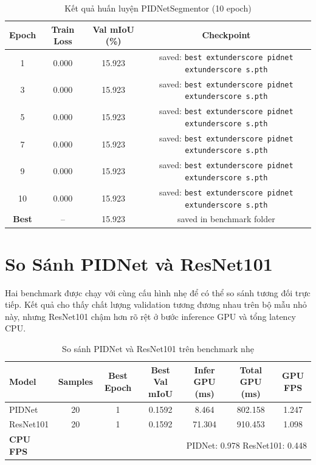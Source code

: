 \documentclass[12pt,a4paper]{article}
\begin{document}
\begin{table}[H]
\centering
\caption{Kết quả huấn luyện PIDNetSegmentor (10 epoch)}
\label{tab:train_res}
\begin{tabular}{cccc}
\toprule
\textbf{Epoch} & \textbf{Train Loss} & \textbf{Val mIoU (\%)} & \textbf{Checkpoint} \\
\midrule
1 & 0.000 & 15.923 & saved: \texttt{best	extunderscore pidnet	extunderscore s.pth} \\
3 & 0.000 & 15.923 & saved: \texttt{best	extunderscore pidnet	extunderscore s.pth} \\
5 & 0.000 & 15.923 & saved: \texttt{best	extunderscore pidnet	extunderscore s.pth} \\
7 & 0.000 & 15.923 & saved: \texttt{best	extunderscore pidnet	extunderscore s.pth} \\
9 & 0.000 & 15.923 & saved: \texttt{best	extunderscore pidnet	extunderscore s.pth} \\
10 & 0.000 & 15.923 & saved: \texttt{best	extunderscore pidnet	extunderscore s.pth} \\
\midrule
\textbf{Best} & -- & 15.923 & saved in benchmark folder \\
\bottomrule
\end{tabular}
\end{table}

\section{So Sánh PIDNet và ResNet101}
Hai benchmark được chạy với cùng cấu hình nhẹ để có thể so sánh tương đối trực tiếp. Kết quả cho thấy chất lượng validation tương đương nhau trên bộ mẫu nhỏ này, nhưng ResNet101 chậm hơn rõ rệt ở bước inference GPU và tổng latency CPU.

\begin{table}[H]
\centering
\caption{So sánh PIDNet và ResNet101 trên benchmark nhẹ}
\label{tab:model_compare}
\begin{tabular}{lcccccc}
\toprule
\textbf{Model} & \textbf{Samples} & \textbf{Best Epoch} & \textbf{Best Val mIoU} & \textbf{Infer GPU (ms)} & \textbf{Total GPU (ms)} & \textbf{GPU FPS} \\
\midrule
PIDNet & 20 & 1 & 0.1592 & 8.464 & 802.158 & 1.247 \\
ResNet101 & 20 & 1 & 0.1592 & 71.304 & 910.453 & 1.098 \\
\midrule
\textbf{CPU FPS} & \multicolumn{6}{r}{PIDNet: 0.978 \hspace{0.8em} ResNet101: 0.448} \\
\bottomrule
\end{tabular}
\end{table}
\end{document}
